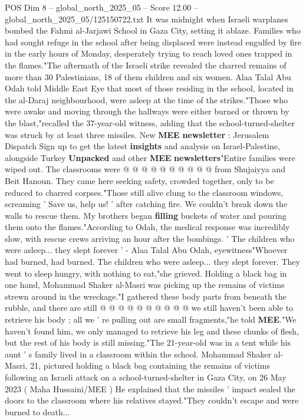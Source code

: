 \begin{textsample}{POS Dim 8 – global\_north\_2025\_05 – Score 12.00 – global\_north\_2025\_05/125150722.txt}  \label{ex:f8_pos_039}
It was midnight when Israeli warplanes bombed the Fahmi al-Jarjawi School in Gaza City, setting it ablaze.
Families who had sought refuge in the school after being displaced were instead engulfed by fire in the early hours of Monday, desperately trying to reach loved ones trapped in the flames."The aftermath of the Israeli strike revealed the charred remains of more than 30 Palestinians, 18 of them children and six women.
Alaa Talal Abu Odah told Middle East Eye that most of those residing in the school, located in the al-Daraj neighbourhood, were asleep at the time of the strikes."Those who were awake and moving through the hallways were either burned or thrown by the blast,"recalled the 37-year-old witness, adding that the school-turned-shelter was struck by at least three missiles.
New \textbf{MEE} \textbf{newsletter} : Jerusalem Dispatch Sign up to get the latest \textbf{insights} and analysis on Israel-Palestine, alongside Turkey \textbf{Unpacked} and other \textbf{MEE} \textbf{newsletters}"Entire families were wiped out.
The classrooms were @ @ @ @ @ @ @ @ @ @ from Shujaiyya and Beit Hanoun.
They came here seeking safety, crowded together, only to be reduced to charred corpses."Those still alive clung to the classroom windows, screaming ' Save us, help us! ' after catching fire.
We couldn't break down the walls to rescue them.
My brothers began \textbf{filling} buckets of water and pouring them onto the flames."According to Odah, the medical response was incredibly slow, with rescue crews arriving an hour after the bombings. ' The children who were asleep... they slept forever ' - Alaa Talal Abu Odah, eyewitness"Whoever had burned, had burned.
The children who were asleep... they slept forever.
They went to sleep hungry, with nothing to eat,"she grieved.
Holding a black bag in one hand, Mohammad Shaker al-Masri was picking up the remains of victims strewn around in the wreckage."I gathered these body parts from beneath the rubble, and there are still @ @ @ @ @ @ @ @ @ @ we still haven't been able to retrieve his body ; all we ' re pulling out are small fragments,"he told \textbf{MEE}."We haven't found him, we only managed to retrieve his leg and these chunks of flesh, but the rest of his body is still missing."The 21-year-old was in a tent while his aunt ' s family lived in a classroom within the school.
Mohammad Shaker al-Masri, 21, pictured holding a black bag containing the remains of victims following an Israeli attack on a school-turned-shelter in Gaza City, on 26 May 2023 ( Maha Hussaini/MEE ) He explained that the missiles ' impact sealed the doors to the classroom where his relatives stayed."They couldn't escape and were burned to death...

\end{textsample}
